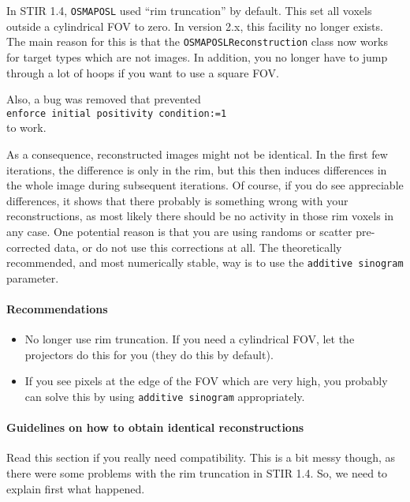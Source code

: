 \documentclass{article}
\begin{document}
In STIR 1.4, \texttt{OSMAPOSL} used ``rim truncation'' by default. This 
set all voxels outside a cylindrical FOV to zero. In version 2.x, this facility
no longer exists. The main reason for this is that the
\texttt{OSMAPOSLReconstruction} class now works for target types which are 
not images. In addition, you no longer have to jump through a lot of hoops 
if you want to use a square FOV. 

Also, a bug was removed that prevented\\
\texttt{enforce initial positivity condition:=1}\\
to work.

As a consequence, reconstructed images might not be identical. In the first
few iterations, the difference is only in the rim, but this then
induces differences in the whole image during subsequent iterations. Of course,
if you do see appreciable differences, it shows that there probably is something
wrong with your reconstructions, as most likely there should be no activity
in those rim voxels in any case. One potential reason is that you are
using randoms or scatter pre-corrected data, or do not use this corrections 
at all. The theoretically recommended, and most numerically stable,
 way is to use the \texttt{additive sinogram} parameter.\\


\paragraph{Recommendations}
\begin{itemize}
\item No longer use rim truncation. If you need a cylindrical FOV, let the
projectors do this for you (they do this by default).
\item If you see pixels at the edge of the FOV which are very high, you
probably can solve this by using  \texttt{additive sinogram} appropriately.
\end{itemize}

\paragraph{Guidelines on how to obtain identical reconstructions\\}
Read this section if you really need compatibility. This is a bit 
messy though, as there were some problems
with the rim truncation in STIR 1.4. So, we need to explain first
what happened.
\end{document}
